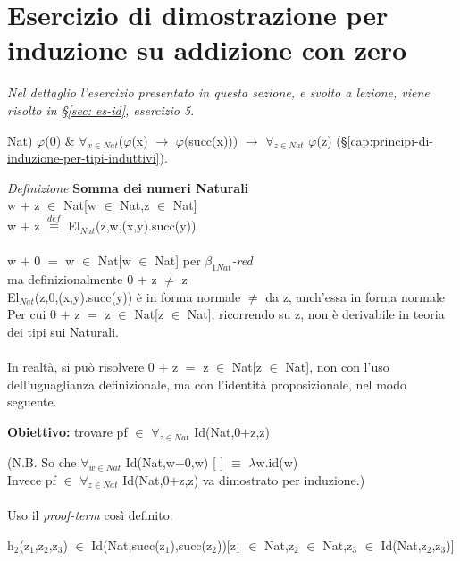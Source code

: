 \section{Esercizio di dimostrazione per induzione su addizione con zero}
\label{sec:esercizio-di-dimostrazione-per-induzione-su-addizione-con-zero}
\textit{Nel dettaglio l'esercizio presentato in questa sezione, e svolto a lezione, viene risolto in \S \ref{sec: es-id}, esercizio 5}.
\noindent
\begin{center}Nat) $\varphi$(0) $\&$ $\forall_{x \in Nat}$($\varphi$(x) $\rightarrow$ $\varphi$(succ(x))) $\rightarrow$ $\forall_{z \in Nat}$ $\varphi$(z) (\S \ref{cap:principi-di-induzione-per-tipi-induttivi}).\end{center}
\noindent
\textit{Definizione} \textbf{Somma dei numeri Naturali}\\
w $+$ z $\in$ Nat[w $\in$ Nat,z $\in$ Nat]\\
w $+$ z ${\overset{\mathit{def}}{\equiv}}$ El$_{Nat}$(z,w,(x,y).succ(y))\\\\ 
\noindent
w $+$ 0 $=$ w $\in$ Nat[w $\in$ Nat] per \textit{$\beta_{1Nat}$-red}\\
ma definizionalmente 0 $+$ z $\neq$ z\\
El$_{Nat}$(z,0,(x,y).succ(y)) \`e in forma normale $\neq$ da z, anch'essa in forma normale\\
Per cui 0 $+$ z $=$ z $\in$ Nat[z $\in$ Nat], ricorrendo su z, non \`e derivabile in teoria dei tipi sui Naturali.\\\\
\noindent 
In realt\`a, si pu\`o risolvere 0 $+$ z $=$ z $\in$ Nat[z $\in$ Nat], non con l'uso dell'uguaglianza definizionale, ma con l'identit\`a proposizionale, nel modo seguente.\\
\begin{center}\textbf{Obiettivo:} trovare pf $\in$ $\forall_{z \in Nat}$ Id(Nat,0$+$z,z)\end{center}
(N.B. So che
$\forall_{w \in Nat}$ Id(Nat,w+0,w) [ ] $\equiv$ $\lambda$w.id(w)\\
Invece pf $\in$ $\forall_{z \in Nat}$ Id(Nat,0$+$z,z) va dimostrato per induzione.)
\noindent
\\\\
Uso il \textit{proof-term} cos\`i definito:
\begin{center} h$_2$(z$_1$,z$_2$,z$_3$) $\in$ Id(Nat,succ(z$_1$),succ(z$_2$))[z$_1$ $\in$ Nat,z$_2$ $\in$ Nat,z$_3$ $\in$ Id(Nat,z$_2$,z$_3$)]\end{center}

